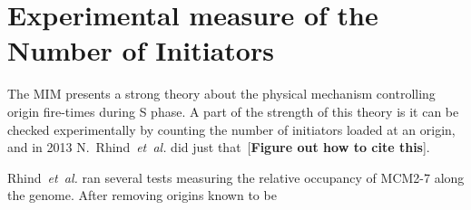 	\section{Experimental measure of the Number of Initiators}
	
	The MIM presents a strong theory about the physical mechanism controlling origin fire-times during S phase.
	A part of the strength of this theory is it can be checked experimentally by counting the number of initiators loaded at an origin, and in 2013 N.~Rhind~\emph{et~al.} did just that~[\textbf{Figure out how to cite this}].
	
	Rhind~\emph{et~al.} ran several tests measuring the relative occupancy of MCM2-7 along the genome.
	After removing origins known to be 










































